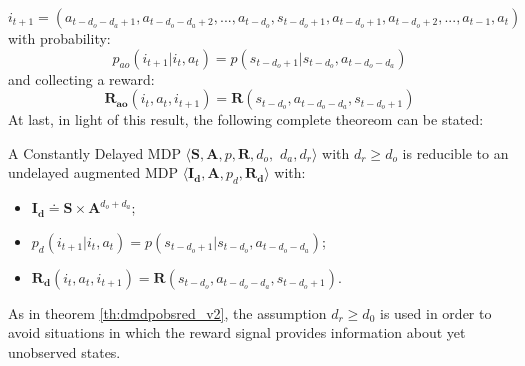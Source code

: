                 \[i_{t+1} = \left( a_{t-d_{o}-d_{a}+1}, a_{t-d_{o}-d_{a}+2}, ..., a_{t-d_{o}}, s_{t-d_{o}+1}, a_{t-d_{o}+1}, a_{t-d_{o}+2}, ..., a_{t-1}, a_{t}\right)\] 
                \noindent
                with probability: 
                \[p_{ao} \left( i_{t+1} | i_t, a_{t} \right) = p \left( s_{t-d_o+1} | s_{t-d_o}, a_{t-d_o-d_a} \right)\]
                \noindent
                and collecting a reward:
                \[\mathbf{R_{ao}}(i_t,a_t, i_{t+1}) = \mathbf{R}(s_{t-d_{o}}, a_{t-d_o-d_a}, s_{t-d_{o}+1})\]
                \noindent
                At last, in light of this result, the following complete theoreom can be stated:
                
                \begin{theorem}
                    \label{th:dmdpred}
                    A Constantly Delayed MDP $\langle \mathbf{S}, \mathbf{A}, p, \mathbf{R}, d_o,$ $d_a, d_r \rangle$ with $d_r \geq d_o$ is reducible to an undelayed augmented MDP $\langle \mathbf{I_d}, \mathbf{A}, p_d, \mathbf{R_d} \rangle$ with: 
                    \begin{itemize}[topsep=0.5em, partopsep=0.5em]
                        \setlength\itemsep{0em}
                        \item $\mathbf{I_d} \doteq \mathbf{S} \times \mathbf{A}^{d_o+d_a}$;
                        \item $p_d \left( i_{t+1} | i_t, a_{t} \right) = p \left( s_{t-d_o+1} | s_{t-d_o}, a_{t-d_o-d_a} \right)$;
                        \item $\mathbf{R_d}(i_t,a_t, i_{t+1}) = \mathbf{R}(s_{t-d_{o}}, a_{t-d_o-d_a}, s_{t-d_{o}+1})$.
                    \end{itemize}
                \end{theorem}
                \noindent
                As in theorem \ref{th:dmdpobsred_v2}, the assumption $d_r \geq d_0$ is used in order to avoid situations in which the reward signal provides information about yet unobserved states. 
            
                
